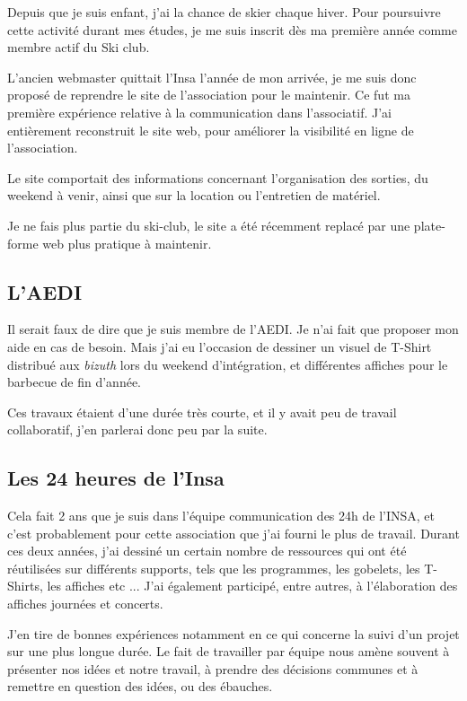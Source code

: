         Depuis que je suis enfant,  j'ai la chance de skier chaque hiver. Pour poursuivre cette activité durant mes études, je me suis inscrit dès ma première année comme membre actif du Ski club.
        
        L'ancien webmaster quittait l'Insa l'année de mon arrivée, je me suis donc proposé de reprendre le site de l'association pour le maintenir.
        Ce fut ma première expérience relative à la communication dans l'associatif.
        J'ai entièrement reconstruit le site web, pour améliorer la visibilité en ligne de l'association.
        
        Le site comportait des informations concernant l'organisation des sorties, du weekend à venir, ainsi que sur la location ou l'entretien de matériel.
        
        Je ne fais plus partie du ski-club, le site a été récemment replacé par une plate-forme web plus pratique à maintenir. 
        
    \subsection{L'AEDI}
        
        Il serait faux de dire que je suis membre de l'AEDI. Je n'ai fait que proposer mon aide en cas de besoin.
        Mais j'ai eu l'occasion de dessiner un visuel de T-Shirt distribué aux \emph{bizuth} lors du weekend d'intégration, et différentes affiches pour le barbecue de fin d'année.
        
        Ces travaux étaient d'une durée très courte, et il y avait peu de travail collaboratif, j'en parlerai donc peu par la suite.
        
    \subsection{Les 24 heures de l'Insa}
        
        Cela fait 2 ans que je suis dans l'équipe communication des 24h de l'INSA, et c'est probablement pour cette association que j'ai fourni le plus de travail.
        Durant ces deux années,  j'ai dessiné un certain nombre de ressources qui ont été réutilisées sur différents supports, tels que les programmes, les gobelets, les T-Shirts, les affiches etc ...
        J'ai également participé, entre autres, à l'élaboration des affiches journées et concerts.
        
        J'en tire de bonnes expériences notamment en ce qui concerne la suivi d'un projet sur une plus longue durée.
        Le fait de travailler par équipe nous amène souvent à présenter nos idées et notre travail, à prendre des décisions communes et à remettre en question des idées, ou des ébauches.
        
